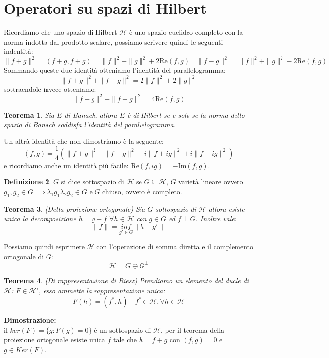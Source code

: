 \documentclass[12pt]{book}
\theoremstyle{plain}
\renewcommand{\H}{\mathcal{H}}
\newtheorem{thm}{Teorema}[section]
\theoremstyle{definition}
\newtheorem{dfn}[thm]{Definizione}
\theoremstyle{remark}
\begin{document}
\section{Operatori su spazi di Hilbert}
Ricordiamo che uno spazio di Hilbert $\H$ è uno spazio euclideo completo con la norma indotta dal prodotto scalare, possiamo scrivere quindi le seguenti indentità:
\begin{equation}
\label{identitautile}
\|f+g\|^2 = (f+g,f+g)=\|f\|^2 + \|g\|^2 + 2\text{Re}(f,g)\quad\|f-g\|^2 = \|f\|^2 + \|g\|^2 - 2\text{Re}(f,g)
\end{equation}
Sommando queste due identità otteniamo l'identità del parallelogramma:
\[\|f+g\|^2 + \|f-g\|^2 = 2\|f\|^2+2\|g\|^2\]
sottraendole invece otteniamo:
\[\|f+g\|^2 - \|f-g\|^2 = 4\text{Re}(f,g)\]
\begin{thm}
Sia $E$ di Banach, allora $E$ è di Hilbert se e solo se la norma dello spazio di Banach soddisfa l'identità del parallelogramma.
\end{thm}
\hspace{-1.6em}Un altrà identità che non dimostriamo è la seguente:
\[(f,g) = \frac{1}{4}(\|f+g\|^2 - \|f-g\|^2 -i\|f+ig\|^2 + i\|f-ig\|^2)\]
e ricordiamo anche un identità più facile: $\text{Re}(f,ig) = -\text{Im}(f,g)$.
\begin{dfn}
$G$ si dice sottospazio di $\H$ se $G\subseteq \H$, $G$ varietà lineare ovvero $g_1,g_2\in G\implies \lambda_1g_1\lambda_2g_2\in G$ e $G$ chiuso, ovvero è completo.
\end{dfn}
\begin{thm}
(Della proiezione ortogonale) Sia $G$ sottospazio di $\H$ allora esiste unica la decomposizione $h = g+f$ $\forall h\in\H$ con $g\in G$ ed $f\perp G$.
Inoltre vale:
\[\|f\| =  \underset{g'\in G}{inf}\|h-g'\|\]
\end{thm}
\hspace{-1.6em}Possiamo quindi esprimere $\H$ con l'operazione di somma diretta e il complemento ortogonale di $G$:
\[\H = G \oplus G^{\perp}\]
\begin{thm}
(Di rappresentazione di Riesz)
Prendiamo un elemento del duale di $\H$: $F\in\H'$, esso ammette la rappresentazione unica:
\[F(h) = (f^*,h)\quad f^*\in\H,\forall h\in\H \]
\end{thm}
\hspace{-1.6em}\textbf{Dimostrazione:}\\
il $ker(F) = \{g:F(g)=0\}$ è un sottospazio di $\H$, per il teorema della proiezione ortogonale esiste unica $f$ tale che $h = f+g$ con $(f,g) = 0$ e $g\in Ker(F)$.
\end{document}

